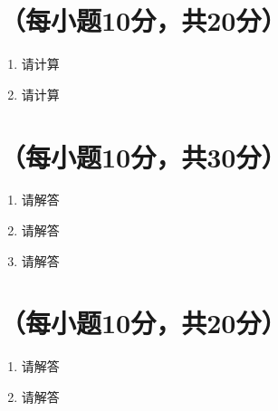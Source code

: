 \documentclass[oneside,AutoFakeBold=2.85]{cjluexam}
\begin{document}
\section{（每小题10分，共20分）}

\begin{enumerate}
  \item
    请计算
    \vspace{8cm}
  \item
    请计算
\end{enumerate}

\clearpage

\section{（每小题10分，共30分）}

\begin{enumerate}
  \item
    请解答
    \vfill
  \item
    请解答
    \vfill
  \item
    请解答
    \vfill
\end{enumerate}

\clearpage

\section{（每小题10分，共20分）}

\begin{enumerate}
  \item
    请解答
    \vfill
  \item
    请解答
    \vfill
\end{enumerate}
\end{document}
